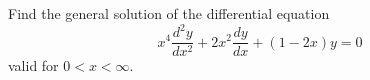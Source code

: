 Find the general solution of the differential equation
$$ x^4 \frac{d^2y}{dx^2} + 2x^2 \frac{dy}{dx} + (1 - 2x)y = 0 $$
valid for $0 < x < \infty$.
